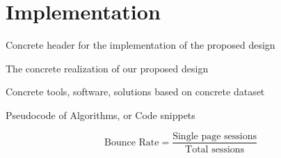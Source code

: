 \chapter{Implementation}
\label{chapter:implementation}

Concrete header for the implementation of the proposed design

The concrete realization of our proposed design

Concrete tools, software, solutions based on concrete dataset

Pseudocode of Algorithms, or Code snippets

\begin{equation}
    \label{eq_bounce-rate}
    \text{Bounce Rate} = \frac{\text{Single page sessions}}
            {\text{Total sessions}}
\end{equation}

 


